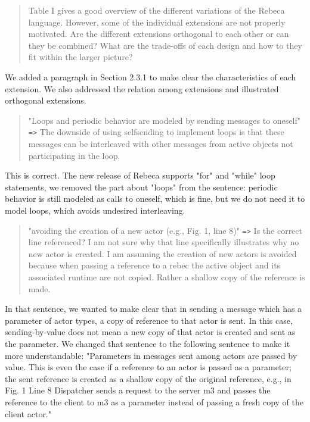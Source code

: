\documentclass{article}
\begin{document}
\begin{quote}
	Table I gives a good overview of the different variations of the Rebeca language. 
However, some of the individual extensions are not properly motivated. Are the different 
extensions orthogonal to each other or can they be combined? What are the trade-offs of 
each design and how to they fit within the larger picture?
\end{quote}

We added a paragraph in Section 2.3.1 to make clear the characteristics of each 
extension. We also addressed the relation among extensions and illustrated orthogonal 
extensions.


\begin{quote}
"Loops and periodic behavior are modeled by sending messages to oneself" \texttt{=>} The downside 
of using selfsending to implement loops is that these messages can be interleaved with 
other messages from active objects not participating in the loop.
\end{quote}
This is correct.  The new release of Rebeca supports "for" and "while" loop statements, 
we removed the part about "loops" from the sentence: periodic behavior is still 
modeled as calls to oneself, which is fine, but we do not need it to model loops, which 
avoids undesired interleaving.


\begin{quote}
	"avoiding the creation of a new actor (e.g., Fig. 1, line 8)" \texttt{=>} Is the correct line 
referenced? I am not sure why that line specifically illustrates why no new actor is 
created. I am assuming the creation of new actors is avoided because when passing a 
reference to a rebec the active object and its associated runtime are not copied. Rather 
a shallow copy of the reference is made.
\end{quote}

In that sentence, we wanted to make clear that in sending a message which has a parameter 
of actor types, a copy of reference to that actor is sent. In this case, sending-by-value 
does not mean a new copy of that actor is created and sent as the parameter.
We changed that sentence to the following sentence to make it more understandable: 
"Parameters in messages sent among actors are passed by value. This is even the case if a 
reference to an actor is passed as a parameter; the sent reference is created as a 
shallow copy of the original reference, e.g., in Fig. 1 Line 8 Dispatcher sends a request 
to the server m3 and passes the reference to the client to m3 as a parameter instead of 
passing a fresh copy of the client actor."
\end{document}
